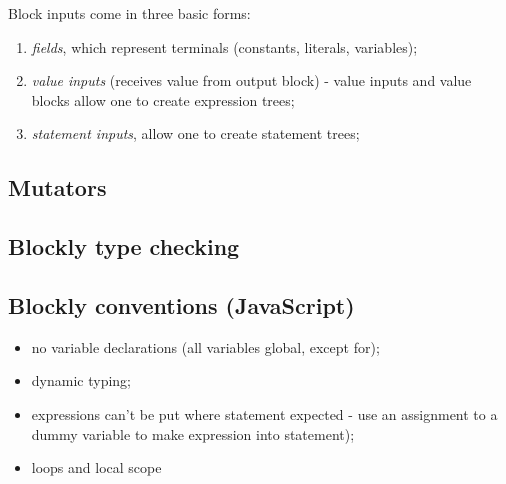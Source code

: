 Block inputs come in three basic forms:
\begin{enumerate}
  \item \emph{fields}, which represent terminals (constants, literals, variables);
  \item \emph{value inputs} (receives value from output block) - value inputs
      and value blocks allow one to create expression trees;
  \item \emph{statement inputs}, allow one to create statement trees;
\end{enumerate}

\subsection{Mutators}

\subsection{Blockly type checking}

\subsection{Blockly conventions (JavaScript)}
\begin{itemize}
  \item no variable declarations (all variables global, except for);
  \item dynamic typing;
  \item expressions can't be put where statement expected 
  - use an assignment to a dummy variable to make expression into statement);
  \item loops and local scope
\end{itemize}